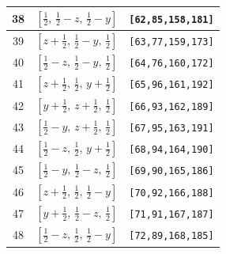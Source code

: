 \documentclass[fleqn,8pt]{jsarticle}
\begin{document}
\begin{longtable}{ccc}
38 & $\left[ \frac{1}{2},\, \frac{1}{2} - z,\, \frac{1}{2} - y \right]$ & {\tt [62,85,158,181]} \\ \hline
39 & $\left[ z + \frac{1}{2},\, \frac{1}{2} - y,\, \frac{1}{2} \right]$ & {\tt [63,77,159,173]} \\ \hline
40 & $\left[ \frac{1}{2} - z,\, \frac{1}{2} - y,\, \frac{1}{2} \right]$ & {\tt [64,76,160,172]} \\ \hline
41 & $\left[ z + \frac{1}{2},\, \frac{1}{2},\, y + \frac{1}{2} \right]$ & {\tt [65,96,161,192]} \\ \hline
42 & $\left[ y + \frac{1}{2},\, z + \frac{1}{2},\, \frac{1}{2} \right]$ & {\tt [66,93,162,189]} \\ \hline
43 & $\left[ \frac{1}{2} - y,\, z + \frac{1}{2},\, \frac{1}{2} \right]$ & {\tt [67,95,163,191]} \\ \hline
44 & $\left[ \frac{1}{2} - z,\, \frac{1}{2},\, y + \frac{1}{2} \right]$ & {\tt [68,94,164,190]} \\ \hline
45 & $\left[ \frac{1}{2} - y,\, \frac{1}{2} - z,\, \frac{1}{2} \right]$ & {\tt [69,90,165,186]} \\ \hline
46 & $\left[ z + \frac{1}{2},\, \frac{1}{2},\, \frac{1}{2} - y \right]$ & {\tt [70,92,166,188]} \\ \hline
47 & $\left[ y + \frac{1}{2},\, \frac{1}{2} - z,\, \frac{1}{2} \right]$ & {\tt [71,91,167,187]} \\ \hline
48 & $\left[ \frac{1}{2} - z,\, \frac{1}{2},\, \frac{1}{2} - y \right]$ & {\tt [72,89,168,185]} \\
\end{longtable}
\renewcommand{\arraystretch}{1.2}
\end{document}
